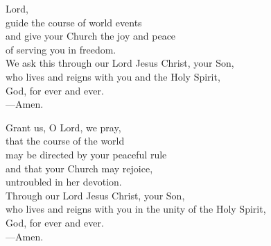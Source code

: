 \prayer


\begin{prayerverse}
Lord,\\
guide the course of world events\\
and give your Church the joy and peace\\
of serving you in freedom.\\
We ask this through our Lord Jesus Christ, your Son,\\
who lives and reigns with you and the Holy Spirit,\\
God, for ever and ever.\\
{\color{red}---\thinspace}Amen.
\end{prayerverse}


\begin{prayerverse}
Grant us, O Lord, we pray,\\
that the course of the world\\
may be directed by your peaceful rule\\
and that your Church may rejoice,\\
untroubled in her devotion.\\
Through our Lord Jesus Christ, your Son,\\
who lives and reigns with you in the unity of the Holy Spirit,\\
God, for ever and ever.\\
{\color{red}---\thinspace}Amen.
\end{prayerverse}

